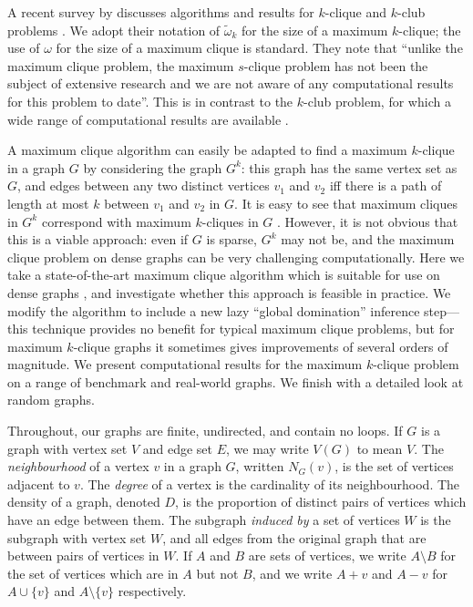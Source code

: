 \documentclass[letterpaper]{article}
\newcommand{\vertexset}{V}
\newcommand{\neighbourhood}{N}
\begin{document}
A recent survey by \citeauthor{Shahinpour:2013}  discusses algorithms and
results for $k$-clique and $k$-club problems .  We adopt their notation of $\tilde{\omega}_k$ for
the size of a maximum $k$-clique; the use of $\omega$ for the size of a maximum clique is standard.
They note that ``unlike the maximum clique problem, the maximum $s$-clique problem has not been the
subject of extensive research and we are not aware of any computational results for this problem to
date''. This is in contrast to the $k$-club problem, for which a wide range of computational results
are available
\cite{Bourjolly:2000,Bourjolly:2002,Mahdavi:2012,Hartung:2012,Chang:2013,Shahinpour:2013,Wotzlaw:2014,Picker:2015,Carvalho:2016}.

A maximum clique algorithm can easily be adapted to find a maximum $k$-clique in a graph $G$ by
considering the graph $G^k$: this graph has the same vertex set as $G$, and edges between any two
distinct vertices $v_1$ and $v_2$ iff there is a path of length at most $k$ between $v_1$ and $v_2$
in $G$. It is easy to see that maximum cliques in $G^k$ correspond with maximum $k$-cliques in $G$
\cite{Balasundaram:2005}.  However, it is not obvious that this is a viable approach: even if $G$ is
sparse, $G^k$ may not be, and the maximum clique problem on dense graphs can be very challenging
computationally. Here we take a state-of-the-art maximum clique algorithm which is suitable for use
on dense graphs \cite{Prosser:2012}, and investigate whether this approach is feasible in practice.
We modify the algorithm to include a new lazy ``global domination'' inference step---this technique
provides no benefit for typical maximum clique problems, but for maximum $k$-clique graphs it
sometimes gives improvements of several orders of magnitude. We present computational results for
the maximum $k$-clique problem on a range of benchmark and real-world graphs. We finish with a
detailed look at random graphs.

Throughout, our graphs are finite, undirected, and contain no loops. If $G$ is a graph with vertex
set $V$ and edge set $E$, we may write $\vertexset(G)$ to mean $V$. The \emph{neighbourhood} of a
vertex $v$ in a graph $G$, written $\neighbourhood_G(v)$, is the set of vertices adjacent to $v$.
The \emph{degree} of a vertex is the cardinality of its neighbourhood. The density of a graph,
denoted $D$, is the proportion of distinct pairs of vertices which have an edge between them. The
subgraph \emph{induced by} a set of vertices $W$ is the subgraph with vertex set $W$, and all edges
from the original graph that are between pairs of vertices in $W$. If $A$ and $B$ are sets of
vertices, we write $A \setminus B$ for the set of vertices which are in $A$ but not $B$, and we
write $A + v$ and $A - v$ for $A \cup \{v\}$ and $A \setminus \{v\}$ respectively.
\end{document}
